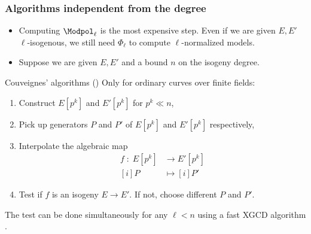\documentclass[10pt]{beamer}
\renewcommand{\emph}[1]{{\usebeamercolor[fg]{structure}#1}}
\begin{document}
\begin{frame}
  \frametitle{Algorithms independent from the degree}
  
  \begin{itemize}
  \item Computing $\Modpol_\ell$ is the most expensive step. Even if
    we are given $E,E'$ $\ell$-isogenous, we still need $\Phi_\ell$ to
    compute $\ell$-normalized models.
  \item Suppose we are given $E,E'$ and a bound $n$ on the isogeny
    degree.
  \end{itemize}

  \begin{block}{Couveignes' algorithms (\cite{couveignes94,couveignes96})}
    Only for \emph{ordinary} curves over finite fields:
    \begin{enumerate}
    \item Construct $E[p^k]$ and $E'[p^k]$ for $p^k\ll n$,
    \item Pick up generators $P$ and $P'$ of $E[p^k]$ and $E'[p^k]$
      respectively,
    \item Interpolate the algebraic map
      \begin{equation*}
        \begin{aligned}
          f\;:\;E[p^k]&\to E'[p^k]\\
          [i]P&\mapsto [i]P' 
        \end{aligned}
      \end{equation*}
    \item \alert{Test if $f$ is an isogeny $E\to E'$}. If not, choose
      different $P$ and $P'$.
    \end{enumerate}
    The test can be done \alert{simultaneously} for any $\ell<n$ using
    a fast XGCD algorithm \parencite{khodadad+monagan06}.
  \end{block}
\end{frame}

\end{document}
